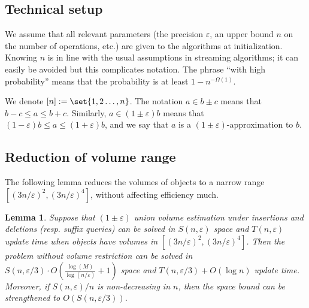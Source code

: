 \documentclass[a4paper, 11pt]{article}
\newtheorem{lemma}[theorem]{Lemma}
\newcommand{\eps}{\varepsilon}
\begin{document}
\subsection{Technical setup}
We assume that all relevant parameters (the precision $\eps$, an upper bound $n$ on the number of operations, etc.) are given to the algorithms at initialization. Knowing $n$ is in line with the usual assumptions in streaming algorithms; it can easily be avoided but this complicates notation. The phrase ``with high probability'' means that the probability is at least $1 - n^{-\Omega(1)}$.

We denote $[n] := \set{1, 2 \dots, n}$. The notation $a \in b \pm c$ means that $b-c \leq a \leq b + c$. Similarly, $a \in (1 \pm \eps) b$ means that $(1-\eps)b \leq a \leq (1 + \eps)b$, and we say that $a$ is a $(1\pm\eps)$-approximation to $b$.

\subsection{Reduction of volume range}
The following lemma reduces the volumes of objects to a narrow range $[(3n/\eps)^2, (3n/\eps)^4]$, without affecting efficiency much.
\begin{lemma}
    \label{lem:reduce-aspect-ratio}
    Suppose that $(1 \pm \eps)$ union volume estimation under insertions and deletions (resp. suffix queries) can be solved in $S(n,\eps)$ space and $T(n,\eps)$ update time when objects have volumes in $[(3n/\eps)^2, (3n/\eps)^4]$. Then the problem without volume restriction can be solved in $S(n,\eps/3) \cdot O\left(\frac{\log(M)}{\log(n/\eps)} + 1\right)$ space and $T(n,\eps/3) + O(\log n)$ update time. Moreover, if $S(n,\eps)/n$ is non-decreasing in $n$, then the space bound can be strengthened to $O(S(n,\eps/3))$.
\end{lemma}
\end{document}
